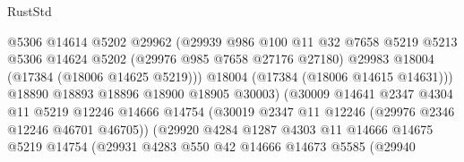 \begin{lexlean}{RustStd}
\begin{coremodule}
                                        @5306
                                        @14614
                                        @5202
                                        @29962
                                        (@29939
                                          @986
                                          @100
                                          @11
                                          @32
                                          @7658
                                          @5219
                                          @5213
                                          @5306
                                          @14624
                                          @5202
                                          (@29976 @985 @7658 @27176 @27180)
                                          @29983
                                          @18004
                                          (@17384 (@18006 @14625 @5219)))
                                        @18004
                                        (@17384 (@18006 @14615 @14631)))
                                      @18890
                                      @18893
                                      @18896
                                      @18900
                                      @18905
                                      @30003)
                                    (@30009
                                      @14641
                                      @2347
                                      @4304
                                      @11
                                      @5219
                                      @12246
                                      @14666
                                      @14754
                                      (@30019 @2347 @11 @12246 (@29976 @2346 @12246 @46701 @46705))
                                      (@29920
                                        @4284
                                        @1287
                                        @4303
                                        @11
                                        @14666
                                        @14675
                                        @5219
                                        @14754
                                        (@29931
                                          @4283
                                          @550
                                          @42
                                          @14666
                                          @14673
                                          @5585
                                          (@29940

\end{coremodule}
\end{lexlean}
